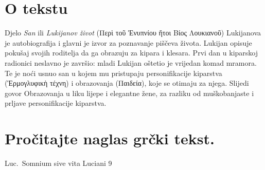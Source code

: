 

\section*{O tekstu}

Djelo \textit{San} ili \textit{Lukijanov život} \textgreek[variant=ancient]{(Περὶ τοῦ Ἐνυπνίου ἤτοι Βίος Λουκιανοῦ)}  Lukijanova je autobiografija i glavni je izvor za poznavanje piščeva života. Lukijan opisuje pokušaj svojih roditelja da ga obrazuju za kipara i klesara. Prvi dan u kiparskoj radionici neslavno je završio: mladi Lukijan oštetio je vrijedan komad mramora. Te je noći usnuo san u kojem mu pristupaju personifikacije kiparstva \textgreek[variant=ancient]{(Ἑρμογλυφικὴ τέχνη)} i obrazovanja \textgreek[variant=ancient]{(Παιδεία),} koje se otimaju za njega. Slijedi govor Obrazovanja u liku lijepe i elegantne žene, za razliku od muškobanjaste i prljave personifikacije kiparstva.

\section*{Pročitajte naglas grčki tekst.}

Luc.\ Somnium sive vita Luciani 9


\medskip


